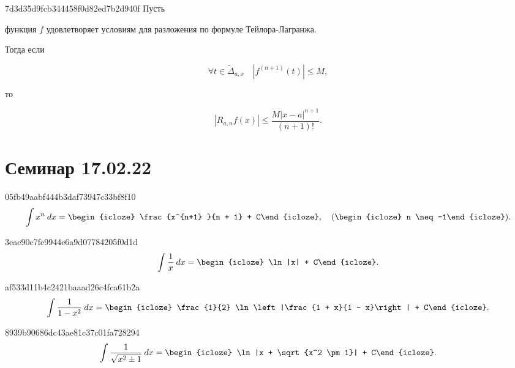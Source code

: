\begin{note}{7d3d35d9fcb344458f0d82ed7b2d940f}
    Пусть \begin{icloze}{3}функция \( f \) удовлетворяет условиям для разложения по формуле Тейлора-Лагранжа.\end{icloze}
    Тогда если
    \begin{icloze}{2}
        \[
            \forall t \in \widetilde \Delta _{a, x} \quad |f^{(n + 1)} (t)| \leqslant M,
        \]
    \end{icloze}
    то
    \begin{icloze}{1}
        \[
            |R_{a, n} f(x)| \leqslant \frac{M|x - a|^{n + 1} }{(n + 1)! }.
        \]
    \end{icloze}
\end{note}

\section{Семинар 17.02.22}
\begin{note}{05fb49aabf444b3daf73947c33bf8f10}
    \[
        \int x^{n} \: dx = \begin{icloze}{1}\frac{x^{n+1} }{n + 1} + C\end{icloze}, \quad (\begin{icloze}{2}n \neq -1\end{icloze}).
    \]
\end{note}

\begin{note}{3eae90c7fe9944e6a9d07784205f0d1d}
    \[
        \int \frac{1}{x} \: dx = \begin{icloze}{1}\ln |x| + C\end{icloze}.
    \]
\end{note}

\begin{note}{af533d11b4c2421baaad26c4fca61b2a}
    \[
        \int \frac{1}{1 - x^2 } \: dx = \begin{icloze}{1}\frac{1}{2} \ln\left|\frac{1 + x}{1 - x}\right| + C\end{icloze}.
    \]
\end{note}

\begin{note}{8939b90686dc43ae81c37c01fa728294}
    \[
        \int \frac{1}{\sqrt{x^2 \pm 1} } \: dx = \begin{icloze}{1}\ln |x + \sqrt{x^2 \pm 1}| + C\end{icloze}.
    \]
\end{note}

